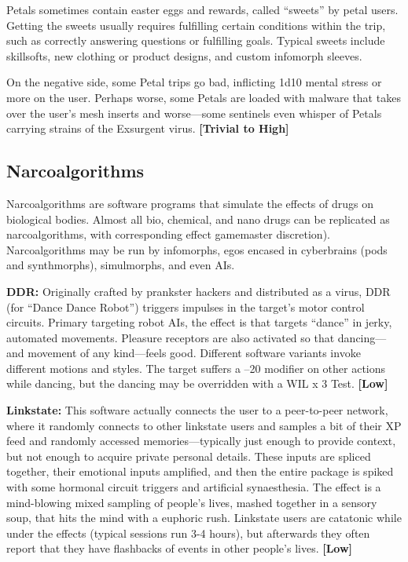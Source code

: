 Petals sometimes contain easter eggs and rewards, 
called ``sweets'' by petal users. Getting the sweets usually
requires fulfilling certain conditions within the
trip, such as correctly answering questions or fulfilling 
goals. Typical sweets include skillsofts, new clothing 
or product designs, and custom infomorph sleeves.

On the negative side, some Petal trips go bad, inflicting
1d10 mental stress or more on the user. Perhaps
worse, some Petals are loaded with malware that
takes over the user's mesh inserts and worse—some 
sentinels even whisper of Petals carrying strains of the 
Exsurgent virus. \textbf{[Trivial to High]}

\subsection{Narcoalgorithms}

Narcoalgorithms are software programs that simulate 
the effects of drugs on biological bodies. Almost all 
bio, chemical, and nano drugs can be replicated as 
narcoalgorithms, with corresponding effect gamemaster
discretion). Narcoalgorithms may be run by
infomorphs, egos encased in cyberbrains (pods and 
synthmorphs), simulmorphs, and even AIs.

\textbf{DDR:} Originally crafted by prankster hackers 
and distributed as a virus, DDR (for ``Dance Dance 
Robot'') triggers impulses in the target's motor control
circuits. Primary targeting robot AIs, the effect is
that targets ``dance'' in jerky, automated movements. 
Pleasure receptors are also activated so that dancing—
and movement of any kind—feels good. Different 
software variants invoke different motions and styles. 
The target suffers a –20 modifier on other actions 
while dancing, but the dancing may be overridden 
with a WIL x 3 Test. \textbf{[Low]}

\textbf{Linkstate:} This software actually connects the user 
to a peer-to-peer network, where it randomly connects
to other linkstate users and samples a bit of their
XP feed and randomly accessed memories—typically 
just enough to provide context, but not enough to 
acquire private personal details. These inputs are 
spliced together, their emotional inputs amplified, and 
then the entire package is spiked with some hormonal 
circuit triggers and artificial synaesthesia. The effect 
is a mind-blowing mixed sampling of people's lives, 
mashed together in a sensory soup, that hits the mind 
with a euphoric rush. Linkstate users are catatonic 
while under the effects (typical sessions run 3-4 hours), 
but afterwards they often report that they have flashbacks
of events in other people's lives. \textbf{[Low]}


